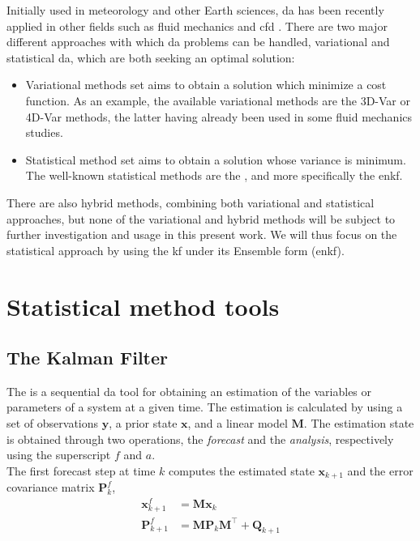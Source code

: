 \documentclass[12pt,twoside]{report}
\begin{document}
Initially used in meteorology and other Earth sciences, \gls{da} has been recently applied in other fields such as fluid mechanics and \gls{cfd} \citep[see][]{meldi_reduced_2017, meldi_augmented_2018, moldovan_multigridensemble_2021, moldovan_optimized_2022}. There are two major different approaches with which \gls{da} problems can be handled, variational and statistical \gls{da}, which are both seeking an optimal solution:
\begin{itemize}
    \item[$-$] Variational methods set aims to obtain a solution which minimize a cost function. As an example, the available variational methods are the 3D-Var or 4D-Var methods, the latter having already been used in some fluid mechanics studies. 
    \item[$-$] Statistical method set aims to obtain a solution whose variance is minimum. The well-known statistical methods are the , and more specifically the \gls{enkf}.
\end{itemize}

There are also hybrid methods, combining both variational and statistical approaches, but none of the variational and hybrid methods will be subject to further investigation and usage in this present work. We will thus focus on the statistical approach by using the \gls{kf} under its Ensemble form (\gls{enkf}). 

\section{Statistical method tools}
\subsection{The Kalman Filter}

The  \citep{kalman_new_1960} is a sequential \gls{da} tool for obtaining an estimation of the variables or parameters of a system at a given time. The estimation is calculated by using a set of observations $\mathbf{y}$, a prior state $\mathbf{x}$, and a linear model $\mathbf{M}$.  The estimation state is obtained through two operations, the \textsl{forecast} and the \textsl{analysis}, respectively using the superscript $f$ and $a$. \\
The first forecast step at time $k$ computes the estimated state $\mathbf{x}_{k+1}$ and the error covariance matrix $\mathbf{P}_k^f$, 
\begin{align}
    \mathbf{x}^f_{k+1} &= \mathbf{M} \mathbf{x}_k \\
    \mathbf{P}^f_{k+1} &= \mathbf{M} \mathbf{P}_k \mathbf{M}^{\top} + \mathbf{Q}_{k+1}
\end{align}
\end{document}
